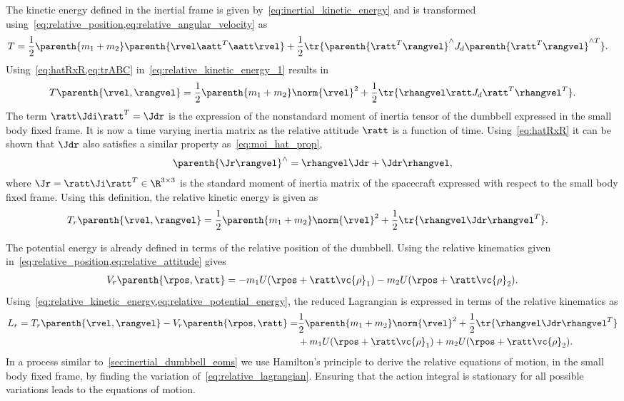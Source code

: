 The kinetic energy defined in the inertial frame is given by~\cref{eq:inertial_kinetic_energy} and is transformed using~\cref{eq:relative_position,eq:relative_angular_velocity} as
\begin{align}\label{eq:relative_kinetic_energy_1}
    T &= \frac{1}{2} \parenth{m_1 + m_2} \parenth{\rvel \aatt^T \aatt \rvel} + \frac{1}{2} \tr{\parenth{\ratt^T \rangvel}^\wedge J_d \parenth{\ratt^T \rangvel }^{\wedge T}}. 
\end{align}
Using~\cref{eq:hatRxR,eq:trABC} in~\cref{eq:relative_kinetic_energy_1} results in
\begin{align}\label{eq:relative_kinetic_energy_2}
    T\parenth{\rvel, \rangvel} = \frac{1}{2} \parenth{m_1 + m_2} \norm{\rvel}^2 + \frac{1}{2} \tr{\rhangvel \ratt J_d \ratt^T \rhangvel^T}.
\end{align}
The term \( \ratt \Jdi \ratt^T = \Jdr\) is the expression of the nonstandard moment of inertia tensor of the dumbbell expressed in the small body fixed frame. 
It is now a time varying inertia matrix as the relative attitude \( \ratt \) is a function of time.
Using~\cref{eq:hatRxR} it can be shown that \( \Jdr \) also satisfies a similar property as~\cref{eq:moi_hat_prop}, 
\begin{align}\label{eq:moi_relative_hat_prop}
    \parenth{\Jr \rangvel}^\wedge = \rhangvel \Jdr + \Jdr\rhangvel,
\end{align}
where \( \Jr = \ratt \Ji \ratt^T \in \R^{3 \times 3}\) is the standard moment of inertia matrix of the spacecraft expressed with respect to the small body fixed frame.
Using this definition, the relative kinetic energy is given as
\begin{align}\label{eq:relative_kinetic_energy}
    T_r\parenth{\rvel, \rangvel} &= \frac{1}{2} \parenth{m_1 + m_2} \norm{\rvel}^2 + \frac{1}{2} \tr{\rhangvel \Jdr \rhangvel^T}.
\end{align}

The potential energy is already defined in terms of the relative position of the dumbbell.
Using the relative kinematics given in~\cref{eq:relative_position,eq:relative_attitude} gives
\begin{align}\label{eq:relative_potential_energy}
    V_r\parenth{\rpos, \ratt} = -m_1 U( \rpos + \ratt \vc{\rho}_1) - m_2 U(\rpos + \ratt \vc{\rho}_2).
\end{align}
Using~\cref{eq:relative_kinetic_energy,eq:relative_potential_energy}, the reduced Lagrangian is expressed in terms of the relative kinematics as 
\begin{align}\label{eq:relative_lagrangian}
    L_r = T_r\parenth{\rvel, \rangvel} - V_r\parenth{\rpos, \ratt} =& \frac{1}{2} \parenth{m_1 + m_2} \norm{\rvel}^2 + \frac{1}{2} \tr{\rhangvel \Jdr \rhangvel^T} \nonumber \\
             &+m_1 U(\rpos + \ratt \vc{\rho}_1) + m_2 U(\rpos + \ratt \vc{\rho}_2) .
\end{align}
In a process similar to~\cref{sec:inertial_dumbbell_eoms} we use Hamilton's principle to derive the relative equations of motion, in the small body fixed frame, by finding the variation of~\cref{eq:relative_lagrangian}.
Ensuring that the action integral is stationary for all possible variations leads to the equations of motion.

